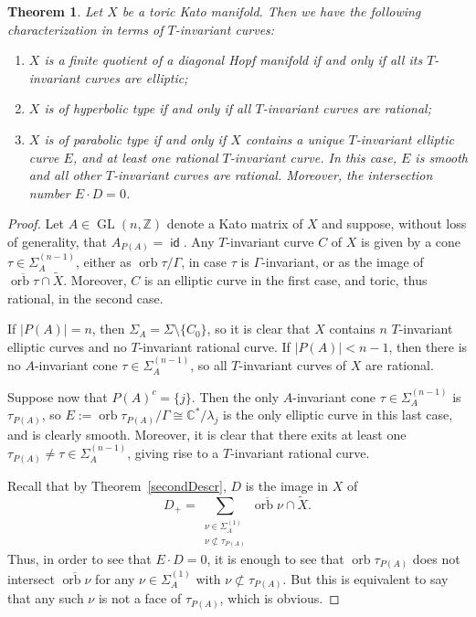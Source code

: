 \documentclass[JEP,XML,SOM,Unicode,NoFloatCountersInSection]{cedram}
\newtheorem{theorem}{Theorem}[section]
\theoremstyle{definition}
\let\wt\widetilde
\let\la\lambda
\let\ov\overline
\let\sminus\setminus
\newcommand{\CC}{\mathbb{C}}
\newcommand{\ZZ}{\mathbb{Z}}
\DeclareMathOperator{\GL}{GL}
\DeclareMathOperator{\id}{\mathsf{id}}
\DeclareMathOperator{\orb}{orb}
\begin{document}
\begin{theorem}\label{hiperpara}
Let $X$ be a toric Kato manifold. Then we have the following characterization in terms of $T$-invariant curves:
\begin{enumerate}
\item $X$ is a finite quotient of a diagonal Hopf manifold if and only if all its $T$\nobreakdash-in\-vari\-ant curves are elliptic;
\item $X$ is of hyperbolic type if and only if all $T$-invariant curves are rational;
\item $X$ is of parabolic type if and only if $X$ contains a unique $T$-invariant elliptic curve $E$, and at least one rational $T$-invariant curve. In this case, $E$ is smooth and all other $T$-invariant curves are rational. Moreover, the intersection number $E\cdot D=0$.
\end{enumerate}
\end{theorem}
\begin{proof}
Let $A\in\GL(n,\ZZ)$ denote a Kato matrix of $X$ and suppose, without loss of generality, that $A_{P(A)}=\id$. Any $T$-invariant curve $C$ of $X$ is given by a cone $\tau\in\Sigma_A^{(n-1)}$, either as $\orb\tau/\Gamma$, in case $\tau$ is $\Gamma$-invariant, or as the image of $\ov{\orb\tau}\cap\wt{X}$. Moreover, $C$ is an elliptic curve in the first case, and toric, thus rational, in the second case.

If $|P(A)|=n$, then $\Sigma_A=\Sigma\sminus\{C_0\}$, so it is clear that $X$ contains $n$ $T$-invariant elliptic curves and no $T$-invariant rational curve. If $|P(A)|<n-1$, then there is no $A$-invariant cone $\tau\in\Sigma_A^{(n-1)}$, so all $T$-invariant curves of $X$ are rational.

Suppose now that $P(A)^c=\{j\}$. Then the only $A$-invariant cone $\tau\in\Sigma_A^{(n-1)}$ is $\tau_{P(A)}$, so $E:=\orb\tau_{P(A)}/\Gamma\cong\CC^*/\la_j$ is the only elliptic curve in this last case, and is clearly smooth. Moreover, it is clear that there exits at least one $\tau_{P(A)}\neq\tau\in\Sigma_A^{(n-1)}$, giving rise to a $T$-invariant rational curve.

Recall that by Theorem~\ref{secondDescr}, $D$ is the image in $X$ of
\begin{equation*}
D_+=\sum_{\substack{\nu\in\Sigma_A^{(1)}\\ \nu\not\subset \tau_{P(A)}}}\ov{\orb\nu}\cap \wt{X}.
\end{equation*}
Thus, in order to see that $E\cdot D=0$, it is enough to see that $\orb\tau_{P(A)}$ does not intersect $\ov{\orb\nu}$ for any $\nu\in\Sigma_A^{(1)}$ with $\nu\not\subset \tau_{P(A)}$. But this is equivalent to say that any such $\nu$ is not a face of $\tau_{P(A)}$, which is obvious.
\end{proof}
\end{document}
